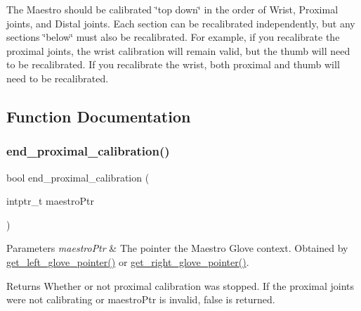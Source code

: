 The Maestro should be calibrated \char`\"{}top down\char`\"{} in the order of Wrist, Proximal joints, and Distal joints. Each section can be recalibrated independently, but any sections \char`\"{}below\char`\"{} must also be recalibrated. For example, if you recalibrate the proximal joints, the wrist calibration will remain valid, but the thumb will need to be recalibrated. If you recalibrate the wrist, both proximal and thumb will need to be recalibrated. 

\subsection{Function Documentation}
\mbox{\label{group__glove_calibration_gaca292cd71d6b63a803381ba9a43c3d85}} 
\subsubsection{\texorpdfstring{end\+\_\+proximal\+\_\+calibration()}{end\_proximal\_calibration()}}
{\footnotesize\ttfamily bool end\+\_\+proximal\+\_\+calibration (\begin{DoxyParamCaption}\item[{intptr\+\_\+t}]{maestro\+Ptr }\end{DoxyParamCaption})}


\begin{DoxyParams}{Parameters}
{\em maestro\+Ptr} & The pointer the Maestro Glove context. Obtained by \hyperlink{group__glove_management_ga63ce3c99d4a8b8db851b22af9185764e}{get\+\_\+left\+\_\+glove\+\_\+pointer()} or \hyperlink{group__glove_management_ga9b8fd9d91aeac3f8da50f7a7eba0c32b}{get\+\_\+right\+\_\+glove\+\_\+pointer()}. \\
\hline
\end{DoxyParams}
\begin{DoxyReturn}{Returns}
Whether or not proximal calibration was stopped. If the proximal joints were not calibrating or {\ttfamily maestro\+Ptr} is invalid, {\ttfamily false} is returned. 
\end{DoxyReturn}
\mbox{\label{group__glove_calibration_gaab1a5c7b6a32fa01bfad60f964065355}} 
